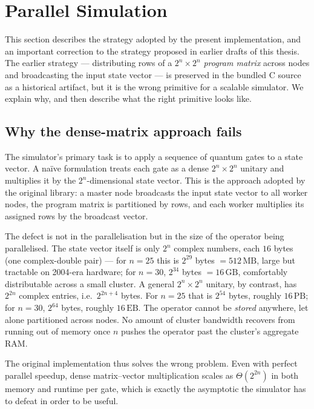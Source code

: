 \setcounter{equation}{0}
\section{Parallel Simulation}
\label{sec:parallel}

This section describes the strategy adopted by the present implementation, and an important correction to the strategy proposed in earlier drafts of this thesis. The earlier strategy --- distributing rows of a $2^n \times 2^n$ \emph{program matrix} across nodes and broadcasting the input state vector --- is preserved in the bundled C source as a historical artifact, but it is the wrong primitive for a scalable simulator. We explain why, and then describe what the right primitive looks like.

\subsection{Why the dense-matrix approach fails}

The simulator's primary task is to apply a sequence of quantum gates to a state vector. A na\"{i}ve formulation treats each gate as a dense $2^n \times 2^n$ unitary and multiplies it by the $2^n$-dimensional state vector. This is the approach adopted by the original library: a master node broadcasts the input state vector to all worker nodes, the program matrix is partitioned by rows, and each worker multiplies its assigned rows by the broadcast vector.

The defect is not in the parallelisation but in the size of the operator being parallelised. The state vector itself is only $2^n$ complex numbers, each $16$ bytes (one complex-double pair) --- for $n=25$ this is $2^{29}$ bytes $= 512\,\text{MB}$, large but tractable on 2004-era hardware; for $n=30$, $2^{34}$ bytes $= 16\,\text{GB}$, comfortably distributable across a small cluster. A general $2^n \times 2^n$ unitary, by contrast, has $2^{2n}$ complex entries, i.e.\ $2^{2n+4}$ bytes. For $n=25$ that is $2^{54}$ bytes, roughly $16\,\text{PB}$; for $n=30$, $2^{64}$ bytes, roughly $16\,\text{EB}$. The operator cannot be \emph{stored} anywhere, let alone partitioned across nodes. No amount of cluster bandwidth recovers from running out of memory once $n$ pushes the operator past the cluster's aggregate RAM.

The original implementation thus solves the wrong problem. Even with perfect parallel speedup, dense matrix--vector multiplication scales as $\Theta(2^{2n})$ in both memory and runtime per gate, which is exactly the asymptotic the simulator has to defeat in order to be useful.

